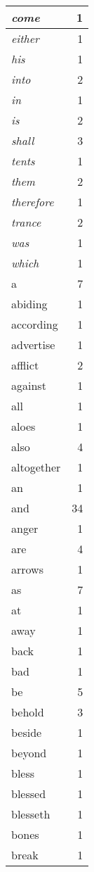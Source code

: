 \begin{center}
\begin{longtable}{l|r}
\emph{come} & 1\\ \hline 
\emph{either} & 1\\ \hline 
\emph{his} & 1\\ \hline 
\emph{into} & 2\\ \hline 
\emph{in} & 1\\ \hline 
\emph{is} & 2\\ \hline 
\emph{shall} & 3\\ \hline 
\emph{tents} & 1\\ \hline 
\emph{them} & 2\\ \hline 
\emph{therefore} & 1\\ \hline 
\emph{trance} & 2\\ \hline 
\emph{was} & 1\\ \hline 
\emph{which} & 1\\ \hline 
a & 7\\ \hline 
abiding & 1\\ \hline 
according & 1\\ \hline 
advertise & 1\\ \hline 
afflict & 2\\ \hline 
against & 1\\ \hline 
all & 1\\ \hline 
aloes & 1\\ \hline 
also & 4\\ \hline 
altogether & 1\\ \hline 
an & 1\\ \hline 
and & 34\\ \hline 
anger & 1\\ \hline 
are & 4\\ \hline 
arrows & 1\\ \hline 
as & 7\\ \hline 
at & 1\\ \hline 
away & 1\\ \hline 
back & 1\\ \hline 
bad & 1\\ \hline 
be & 5\\ \hline 
behold & 3\\ \hline 
beside & 1\\ \hline 
beyond & 1\\ \hline 
bless & 1\\ \hline 
blessed & 1\\ \hline 
blesseth & 1\\ \hline 
bones & 1\\ \hline 
break & 1\\ \hline 

\end{longtable}
\end{center}
